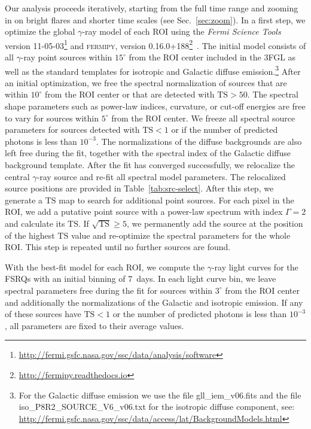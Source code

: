 \documentclass[twocolumn,linenumbers]{aastex62}
\newcommand{\gray}{$\gamma$-ray\xspace}
\begin{document}
Our analysis proceeds iteratively, starting from the full time range and zooming in on bright flares and shorter time scales (see Sec.~\ref{sec:zoom}).
In a first step, we optimize the global \gray model of each ROI using the \textit{Fermi Science Tools} version 11-05-03\footnote{\url{http://fermi.gsfc.nasa.gov/ssc/data/analysis/software}} and \textsc{fermipy}, version 0.16.0+188\footnote{\url{http://fermipy.readthedocs.io}}~\citep{fermipy}.
The initial model consists of all \gray point sources within $15^\circ$ from the ROI center included in the 3FGL as well as the standard templates for isotropic and Galactic diffuse emission.\footnote{For the Galactic diffuse emission we use the file gll\_iem\_v06.fits and the file iso\_P8R2\_SOURCE\_V6\_v06.txt for the isotropic diffuse component, see: \url{ http://fermi.gsfc.nasa.gov/ssc/data/access/lat/BackgroundModels.html}}
After an initial optimization, we free the spectral normalization of sources that are within $10^\circ$ from the ROI center or that are detected with $\mathrm{TS} > 50$.
The spectral shape parameters such as power-law indices, curvature, or cut-off energies are free to vary for sources within $5^\circ$ from the ROI center. 
We freeze all spectral source parameters for sources detected with $\mathrm{TS} < 1$ or if the number of predicted photons is less than $10^{-3}$.
The normalizations of the diffuse backgrounds are also left free during the fit, together with the spectral index of the Galactic diffuse background template.
After the fit has converged successfully, 
we relocalize the central \gray source and re-fit all spectral model parameters. The relocalized source positions are provided in Table~\ref{tab:src-select}.
After this step, we generate a $\mathrm{TS}$ map to search for additional point sources. For each pixel in the ROI, we add a putative point source with a power-law spectrum with index $\Gamma = 2$ and calculate its $\mathrm{TS}$. If  $\sqrt{\mathrm{TS}} \geqslant 5$, we permanently add the source at the position of the highest $\mathrm{TS}$ value and re-optimize the spectral parameters for the whole ROI. This step is repeated until no further sources are found.

With the best-fit model for each ROI, we compute the \gray light curves for the FSRQs with an initial binning of 7~days. 
In each light curve bin, we leave spectral parameters free during the fit for sources within $3^\circ$ from the ROI center and additionally the normalizations of the Galactic and isotropic emission. If any of these sources have $\mathrm{TS} < 1$ or the number of predicted photons is less than $10^{-3}$, all parameters are fixed to their average values.
\end{document}
